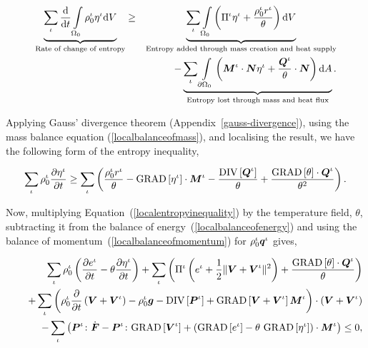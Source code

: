 \begin{eqnarray}
\underbrace{\sum\limits_{\iota}\frac{\mathrm{d}}{\mathrm{d}t}
  \int\limits_{\Omega_0} \rho_0^\iota \eta^\iota
  \mathrm{d}V}_{\text{Rate of change of entropy}} &\geq&
\underbrace{\sum\limits_{\iota}\int\limits_{\Omega_0}\left( \Pi^\iota
  \eta^\iota + \frac{\rho_0^\iota r^\iota}{\theta}\right)
  \mathrm{d}V}_{\text{Entropy added through mass creation and heat
    supply}}\nonumber\\ & &- \underbrace{\sum\limits_{\iota}\int\limits_{\partial
  \Omega_0} \left(\mbox{\boldmath$ M$}^\iota \cdot \mbox{\boldmath$ N$}\eta^\iota +
\frac{\mbox{\boldmath$ Q$}^\iota}{\theta} \cdot \mbox{\boldmath$ N$} \right)\mathrm{d}A}_{\text{Entropy
      lost through mass and heat flux}}.
\label{globalentropyinequality}
\end{eqnarray}

\noindent Applying Gauss' divergence theorem
(Appendix~\ref{gauss-divergence}), using the mass balance equation
(\ref{localbalanceofmass}), and localising the result, we have the
following form of the entropy inequality,

\begin{equation}
\sum\limits_{\iota}\rho_0^\iota\frac{\partial\eta^\iota}{\partial
t} \geq \sum\limits_{\iota}\left(\frac{\rho_0^\iota
r^\iota}{\theta} -\mathrm{GRAD}\left[\eta^\iota\right]\cdot\mbox{\boldmath$ M$}^\iota -
\frac{\mathrm{DIV}\left[\mbox{\boldmath$ Q$}^\iota\right]}{\theta} +
\frac{\mathrm{GRAD}\left[\theta\right]\cdot\mbox{\boldmath$ Q$}^\iota}{\theta^2}\right).
\label{localentropyinequality}
\end{equation}

Now, multiplying Equation~(\ref{localentropyinequality}) by the
temperature field, $\theta$, subtracting it from the balance of
energy~(\ref{localbalanceofenergy}) and using the balance of
momentum~(\ref{localbalanceofmomentum}) for $\rho_0^\iota\mbox{\boldmath$ q$}^\iota$
gives,

\begin{eqnarray}
& &\sum\limits_{\iota}\rho^\iota_0\left(\frac{\partial
e^\iota}{\partial t} -\theta\frac{\partial\eta^\iota}{\partial
t}\right) +\sum\limits_{\iota}\left(\Pi^\iota\left(e^\iota +
\frac{1}{2}\Vert\mbox{\boldmath$ V$}+\mbox{\boldmath$ V$}^\iota\Vert^2\right) +
\frac{\mathrm{GRAD}\left[\theta\right]\cdot\mbox{\boldmath$ Q$}^\iota}{\theta}\right)
\nonumber\\
& &+\sum\limits_{\iota} \left(\rho^\iota_0\frac{\partial}{\partial
t}\left(\mbox{\boldmath$ V$}+\mbox{\boldmath$ V$}^\iota\right) - \rho_0^\iota\mbox{\boldmath$ g$} -
\mathrm{DIV}\left[\mbox{\boldmath$ P$}^\iota\right] +
\mathrm{GRAD}\left[\mbox{\boldmath$ V$}+\mbox{\boldmath$ V$}^\iota\right]\mbox{\boldmath$ M$}^\iota\right)
\cdot\left(\mbox{\boldmath$ V$}+\mbox{\boldmath$ V$}^\iota\right)\nonumber\\
\quad &  &\quad -\sum\limits_{\iota}\left(\mbox{\boldmath$ P$}^\iota\colon\dot{\mbox{\boldmath$ F$}} -
\mbox{\boldmath$ P$}^\iota\colon\mathrm{GRAD}\left[\mbox{\boldmath$ V$}^\iota\right] +
\left(\mathrm{GRAD}\left[e^\iota\right] - 
\theta\ \mathrm{GRAD}\left[\eta^\iota\right]\right)
\cdot\mbox{\boldmath$ M$}^\iota\right)\leq 0,
\label{clausiusduhemform}
\end{eqnarray}

